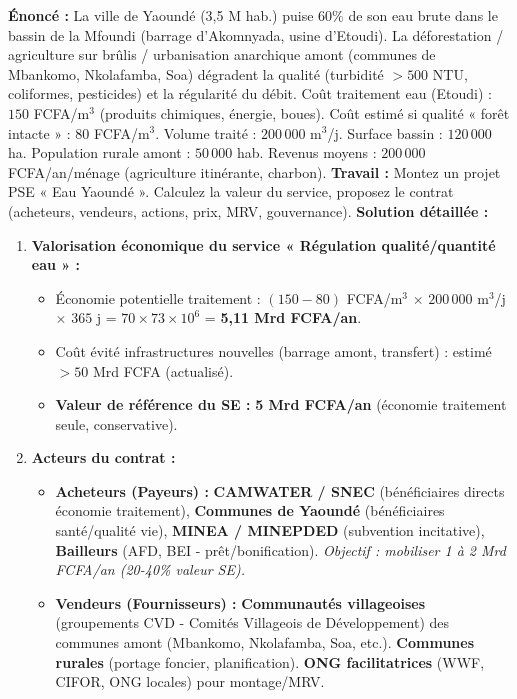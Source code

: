 \documentclass[11pt]{article}
\begin{document}
\begin{exoresolu}
    \textbf{Énoncé :} La ville de Yaoundé (3,5 M hab.) puise $60\%$ de son eau brute dans le bassin de la Mfoundi (barrage d'Akomnyada, usine d'Etoudi). La déforestation / agriculture sur brûlis / urbanisation anarchique amont (communes de Mbankomo, Nkolafamba, Soa) dégradent la qualité (turbidité $> 500$ NTU, coliformes, pesticides) et la régularité du débit. Coût traitement eau (Etoudi) : $150$ FCFA/m$^3$ (produits chimiques, énergie, boues). Coût estimé si qualité « forêt intacte » : $80$ FCFA/m$^3$. Volume traité : $200\,000$ m$^3$/j. Surface bassin : $120\,000$ ha. Population rurale amont : $50\,000$ hab. Revenus moyens : $200\,000$ FCFA/an/ménage (agriculture itinérante, charbon).
    \textbf{Travail :} Montez un projet PSE « Eau Yaoundé ». Calculez la valeur du service, proposez le contrat (acheteurs, vendeurs, actions, prix, MRV, gouvernance).
    \tcblower
    \textbf{Solution détaillée :}
    \begin{enumerate}
        \item \textbf{Valorisation économique du service « Régulation qualité/quantité eau » :}
        \begin{itemize}
            \item Économie potentielle traitement : $(150 - 80)$ FCFA/m$^3$ $\times$ $200\,000$ m$^3$/j $\times$ $365$ j = $70 \times 73 \times 10^6$ = \textbf{5,11 Mrd FCFA/an}.
            \item Coût évité infrastructures nouvelles (barrage amont, transfert) : estimé $> 50$ Mrd FCFA (actualisé).
            \item \textbf{Valeur de référence du SE :} \textbf{5 Mrd FCFA/an} (économie traitement seule, conservative).
        \end{itemize}
        \item \textbf{Acteurs du contrat :}
        \begin{itemize}
            \item \textbf{Acheteurs (Payeurs) :} \textbf{CAMWATER / SNEC} (bénéficiaires directs économie traitement), \textbf{Communes de Yaoundé} (bénéficiaires santé/qualité vie), \textbf{MINEA / MINEPDED} (subvention incitative), \textbf{Bailleurs} (AFD, BEI - prêt/bonification). \textit{Objectif : mobiliser 1 à 2 Mrd FCFA/an (20-40\% valeur SE).}
            \item \textbf{Vendeurs (Fournisseurs) :} \textbf{Communautés villageoises} (groupements CVD - Comités Villageois de Développement) des communes amont (Mbankomo, Nkolafamba, Soa, etc.). \textbf{Communes rurales} (portage foncier, planification). \textbf{ONG facilitatrices} (WWF, CIFOR, ONG locales) pour montage/MRV.

\end{itemize}
\end{enumerate}
\end{exoresolu}
\end{document}
